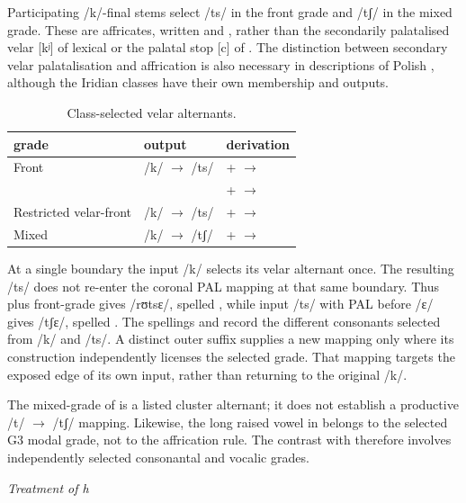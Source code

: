 Participating /k/-final stems select /ts/ in the front grade and /tʃ/ in the
mixed grade. These are affricates, written  and , rather than
the secondarily palatalised velar [kʲ] of lexical  or the palatal
stop [c] of . The distinction between secondary
velar palatalisation and affrication is also necessary in descriptions of
Polish \cite{rubach2019}, although the Iridian classes have their own
membership and outputs.

\begin{table}[ht]
	\footnotesize
	\caption{Class-selected velar alternants.}\label{tab:velar-fronting}
	\begin{tabularx}{\textwidth}{L L L}
		\toprule
		{\sc grade} & {\sc output} & {\sc derivation} \\
		\midrule
		Front & /k/ $\rightarrow$ /ts/ &  +  $\rightarrow$  \\
		& &  +  $\rightarrow$  \\
		Restricted velar-front & /k/ $\rightarrow$ /ts/ &  +  $\rightarrow$  \\
		Mixed & /k/ $\rightarrow$ /tʃ/ &  +  $\rightarrow$  \\
		\bottomrule
	\end{tabularx}
\end{table}

At a single boundary the input /k/ selects its velar alternant once.
The resulting /ts/ does not re-enter the coronal PAL mapping at that same
boundary. Thus  plus front-grade  gives /rʊtsɛ/,
spelled , while input /ts/ with PAL before /ɛ/ gives /tʃɛ/,
spelled . The spellings  and  record the
different consonants selected from /k/ and /ts/. A distinct outer suffix supplies a new mapping only where its construction
independently licenses the selected grade. That mapping targets the exposed
edge of its own input, rather than returning to the original /k/.

The mixed-grade  of  is a listed cluster alternant;
it does not establish a productive /t/ $\rightarrow$ /tʃ/ mapping.
Likewise, the long raised vowel in  belongs to the selected
G3 modal grade, not to the affrication rule. The contrast with 
therefore involves independently selected consonantal and vocalic grades.

\noindent\textit{Treatment of h}\quad

